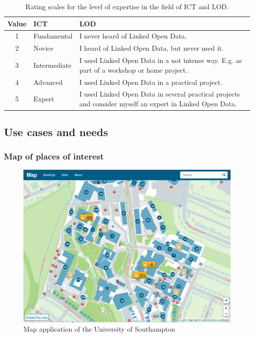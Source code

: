 \documentclass{article}
\begin{document}
\begin{table}[h]
	\begin{tabular}{ c | l  | p{8cm} }
		Value & ICT & LOD\\	
		\hline
		1 & Fundamental & I never heard of Linked Open Data.\\
		\hline
		2 & Novice & I heard of Linked Open Data, but never used it.\\
		\hline
		3 & Intermediate & I used Linked Open Data in a not intense way. E.g. as part of a workshop or home project.\\
		\hline
		4 & Advanced & I used Linked Open Data in a practical project.\\
		\hline
		5 & Expert & I used Linked Open Data in several practical projects and consider myself an expert in Linked Open Data.\\
	\end{tabular}
	\caption{Rating scales for the level of expertise in the field of ICT and LOD.}
	\label{table:interviews-rating scales}
\end{table}

\subsection{Use cases and needs}
\label{lod-benefits-challenges:explored-needs-usecases}


\subsubsection{Map of places of interest}
\label{lod-benefits-challenges:explored-needs-usecases:map}

\begin{figure}[t]
\label{fig:ush-map-app}
\centering \includegraphics*[width=0.75\columnwidth]{images/maps-app/southampton_map_app.png}
\caption{Map application of the University of Southampton}
\end{figure}
\end{document}
